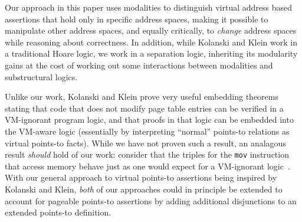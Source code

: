 Our approach in this paper uses modalities to distinguish virtual address based assertions that hold only in specific address spaces, making it possible to manipulate other address spaces, and equally critically, to \emph{change} address spaces while reasoning about correctness. In addition, while Kolanski and Klein work in a traditional Hoare logic, we work in a separation logic, inheriting its modularity gains at the cost of working out some interactions between modalities and substructural logics.

Unlike our work, Kolanski and Klein prove very useful embedding theorems stating that code that does not modify page table entries can be verified in a VM-ignorant program logic, and that proofs in that logic can be embedded into the VM-aware logic (essentially by interpreting ``normal'' points-to relations as virtual points-to facts). While we have not proven such a result, an analagous result \emph{should} hold of our work: consider that the triples for the \texttt{mov} instruction that access memory behave just as one would expect for a VM-ignorant logic~.
With our general approach to virtual points-to assertions being inspired by Kolanski and Klein, \emph{both} of our approaches could in principle be extended to account for pageable points-to assertions by adding additional disjunctions to an extended points-to definition.

